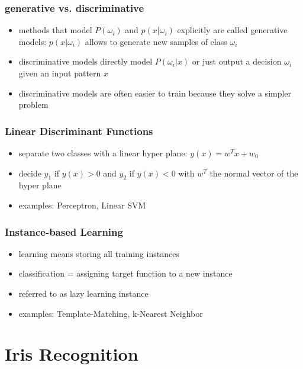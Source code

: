 \documentclass[paper=a4, fontsize=11pt]{scrartcl} %
\numberwithin{equation}{section} %
\numberwithin{figure}{section} %
\numberwithin{table}{section} %
\begin{document}
\subsubsection{generative vs. discriminative}

\begin{itemize}
\item methods that model $P(\omega_i)$ and $p(x|\omega_i)$ explicitly are called generative models: $p(x|\omega_i)$ allows to generate new samples of class $\omega_i$
\item discriminative models directly model $P(\omega_i|x)$ or just output a decision $\omega_i$ given an input pattern $x$
\item discriminative models are often easier to train because they solve a simpler problem
\end{itemize}

\subsubsection{Linear Discriminant Functions}

\begin{itemize}
\item separate two classes with a linear hyper plane: $y(x) = w^T x + w_0$
\item decide $y_1$ if $y(x) > 0$ and $y_2$ if $y(x) < 0$ with $w^T$ the normal vector of the hyper plane
\item examples: Perceptron, Linear SVM
\end{itemize}

\subsubsection{Instance-based Learning}

\begin{itemize}
\item learning means storing all training instances
\item classification = assigning target function to a new instance
\item referred to as lazy learning instance
\item examples: Template-Matching, k-Nearest Neighbor
\end{itemize}

\section{Iris Recognition}
\end{document}
